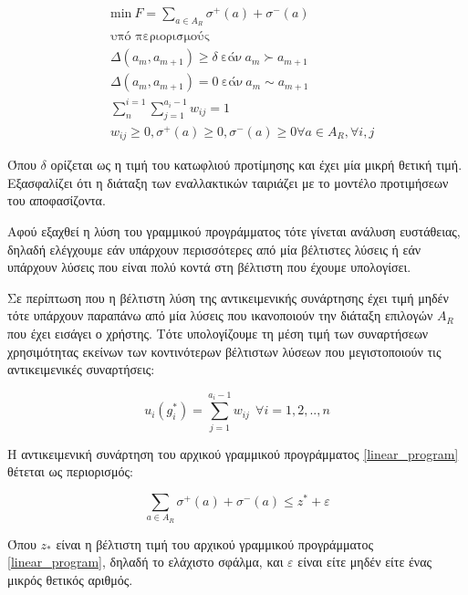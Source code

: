 \documentclass[11pt,a4paper,titlepage]{article}
\numberwithin{equation}{section}
\begin{document}
\begin{equation}\label{linear_program}
	\begin{aligned}
	&\text{min}~F = \sum_{a\in A_{R}} {σ^{+}(a) + σ^{-}(a)} \\
	&\text{υπό περιορισμούς}\\
	&Δ(a_{m},a_{m+1}) \geq δ ~\text{εάν}~ a_{m}\succ a_{m+1}\\
	&Δ(a_{m},a_{m+1}) = 0 ~\text{εάν}~ a_{m}\sim a_{m+1}\\
	&\sum_{n}^{i=1}\sum_{j=1}^{a_{i}-1} w_{ij} = 1\\
	& w_{ij} \geq 0, σ^{+}(a) \geq 0, σ^{-}(a) \geq 0 \forall a\in A_{R}, \forall i,j
	\end{aligned}
\end{equation}
 
\newpage

Όπου $δ$ ορίζεται ως η τιμή του κατωφλιού προτίμησης και έχει μία μικρή θετική τιμή. Εξασφαλίζει ότι η διάταξη των εναλλακτικών ταιριάζει με το μοντέλο προτιμήσεων του αποφασίζοντα.

Αφού εξαχθεί η λύση του γραμμικού προγράμματος τότε γίνεται ανάλυση ευστάθειας, δηλαδή ελέγχουμε εάν υπάρχουν περισσότερες από μία βέλτιστες λύσεις ή εάν υπάρχουν λύσεις που είναι πολύ κοντά στη βέλτιστη που έχουμε υπολογίσει.

Σε περίπτωση που η βέλτιστη λύση της αντικειμενικής συνάρτησης έχει τιμή μηδέν τότε υπάρχουν παραπάνω από μία λύσεις που ικανοποιούν την διάταξη επιλογών $A_{R}$ που έχει εισάγει ο χρήστης. Τότε υπολογίζουμε τη μέση τιμή των συναρτήσεων χρησιμότητας εκείνων των κοντινότερων βέλτιστων λύσεων που μεγιστοποιούν τις αντικειμενικές συναρτήσεις:

\begin{equation}\label{eq:sens-analysis-Obj-Fun}
	u_{i}(g_{i}^{*}) = \sum_{j=1}^{a_{i}-1} w_{ij}  ~~\forall i=1,2,..,n
\end{equation} 

Η αντικειμενική συνάρτηση του αρχικού γραμμικού προγράμματος \eqref{linear_program} θέτεται ως περιορισμός:

\begin{equation}\label{eq:sens-analysis-constr}
	\sum_{a\in A_{R}} {σ^{+}(a) + σ^{-}(a)} \leq z^{*} + ε
\end{equation}

Όπου $z_{*}$ είναι η βέλτιστη τιμή του αρχικού γραμμικού προγράμματος \ref{linear_program}, δηλαδή το ελάχιστο σφάλμα, και $ε$ είναι είτε μηδέν είτε ένας μικρός θετικός αριθμός. 
\end{document}
